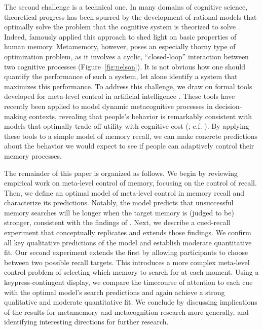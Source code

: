 The second challenge is a technical one. In many domains of cognitive science, theoretical progress has been spurred by the development of rational models that optimally solve the problem that the cognitive system is theorized to solve \citep{savage1954foundations,tenenbaum2001generalization,anderson1991adaptive,knill1996perception,marr1982vision}. Indeed, \citet{anderson1989human} famously applied this approach to shed light on basic properties of human memory. Metamemory, however, poses an especially thorny type of optimization problem, as it involves a cyclic, ``closed-loop'' interaction between two cognitive processes (Figure~\ref{fig:nelson}). It is not obvious how one should quantify the performance of such a system, let alone identify a system that maximizes this performance. To address this challenge, we draw on formal tools developed for meta-level control in artificial intelligence \citep{russell1991principles,hay2016principles}. These tools have recently been applied to model dynamic metacognitive processes in decision-making contexts, revealing that people's behavior is remarkably consistent with models that optimally trade off utility with cognitive cost (\citealp{callaway2021fixation,callaway2022rational}; c.f. \citealp{drugowitsch2012cost,tajima2019optimal,jang2021optimal,chen2021apparently}). By applying these tools to a simple model of memory recall, we can make concrete predictions about the behavior we would expect to see if people can adaptively control their memory processes.

The remainder of this paper is organized as follows. We begin by reviewing empirical work on meta-level control of memory, focusing on the control of recall. Then, we define an optimal model of meta-level control in memory recall and characterize its predictions. Notably, the model predicts that unsuccessful memory searches will be longer when the target memory is (judged to be) stronger, consistent with the findings of \citet{costermans1992confidence}. Next, we describe a cued-recall experiment that conceptually replicates and extends those findings. We confirm all key qualitative predictions of the model and establish moderate quantitative fit. Our second experiment extends the first by allowing participants to choose between two possible recall targets. This introduces a more complex meta-level control problem of selecting which memory to search for at each moment. Using a keypress-contingent display, we compare the timecourse of attention to each cue with the optimal model's search predictions and again achieve a strong qualitative and moderate quantitative fit. We conclude by discussing implications of the results for metamemory and metacognition research more generally, and identifying interesting directions for further research.

